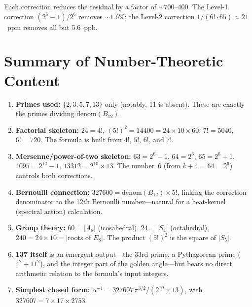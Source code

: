 \documentclass[11pt]{article}
\begin{document}
\noindent
Each correction reduces the residual by a factor of $\sim\!700$--$400$.
The Level-1 correction $(2^6-1)/2^6$ removes $\sim\!1.6\%$;
the Level-2 correction $1/(6!\cdot 65) \approx 21$~ppm removes all but 5.6~ppb.

\section{Summary of Number-Theoretic Content}
\label{sec:summary}

\begin{enumerate}
\item \textbf{Primes used:} $\{2,3,5,7,13\}$ only (notably, 11 is absent).
      These are exactly the primes dividing $\mathrm{denom}(B_{12})$.

\item \textbf{Factorial skeleton:}
      $24 = 4!$,\; $(5!)^2 = 14400 = 24\times 10\times 60$,\;
      $7! = 5040$,\; $6! = 720$.
      The formula is built from $4!$, $5!$, $6!$, and $7!$.

\item \textbf{Mersenne/power-of-two skeleton:}
      $63 = 2^6-1$,\; $64 = 2^6$,\; $65 = 2^6+1$,\;
      $4095 = 2^{12}-1$,\; $13312 = 2^{10}\times 13$.
      The number~6 (from $k+4 = 64 = 2^6$) controls both corrections.

\item \textbf{Bernoulli connection:}
      $327600 = \mathrm{denom}(B_{12})\times 5!$, linking the correction
      denominator to the 12th Bernoulli number---natural for a heat-kernel
      (spectral action) calculation.

\item \textbf{Group theory:}
      $60 = |A_5|$ (icosahedral), $24 = |S_4|$ (octahedral),
      $240 = 24\times 10 = |$roots of $E_8|$.
      The product $(5!)^2$ is the square of $|S_5|$.

\item \textbf{137 itself} is an emergent output---the 33rd prime, a Pythagorean
      prime ($4^2+11^2$), and the integer part of the golden angle---but bears
      no direct arithmetic relation to the formula's input integers.

\item \textbf{Simplest closed form:}
      $\alpha^{-1} = 327607\,\pi^{3/2}/(2^{10}\times 13)$,
      with $327607 = 7\times 17\times 2753$.
\end{enumerate}
\end{document}
